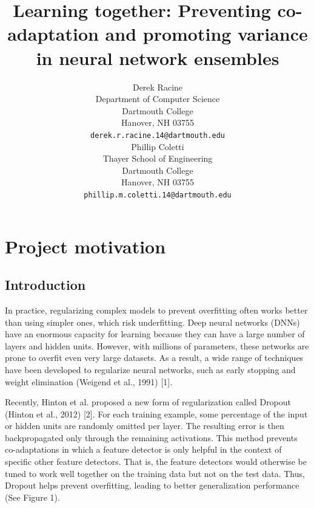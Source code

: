 \documentclass{article} %
\title{Learning together: Preventing co-adaptation and promoting variance in neural network ensembles}
\author{
Derek Racine \\
Department of Computer Science \\
Dartmouth College\\
Hanover, NH 03755 \\
\texttt{derek.r.racine.14@dartmouth.edu} \\
\And
Phillip Coletti\\
Thayer School of Engineering\\
Dartmouth College\\
Hanover, NH 03755 \\
\texttt{phillip.m.coletti.14@dartmouth.edu} \\
}
\begin{document}
\maketitle


\section{Project motivation}

\subsection{Introduction}

In practice, regularizing complex models to prevent overfitting often works better than using simpler ones, which risk underfitting. Deep neural networks (DNNs) have an enormous capacity for learning because they can have a large number of layers and hidden units. However, with millions of parameters, these networks are prone to overfit even very large datasets. As a result, a wide range of techniques have been developed to regularize neural networks, such as early stopping and weight elimination (Weigend et al., 1991) [1].

Recently, Hinton et al. proposed a new form of regularization called Dropout (Hinton et al., 2012) [2]. For each training example, some percentage of the input or hidden units are randomly omitted per layer. The resulting error is then backpropagated only through the remaining activations. This method prevents co-adaptations in which a feature detector is only helpful in the context of specific other feature detectors. That is, the feature detectors would otherwise be tuned to work well together on the training data but not on the test data. Thus, Dropout helps prevent overfitting, leading to better generalization performance (See Figure 1).
\end{document}
